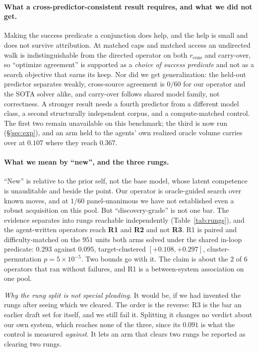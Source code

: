 \documentclass[11pt]{article}
\begin{document}
\paragraph{What a cross-predictor-consistent result requires, and what we did not get.} Making the success
predicate a conjunction does help, and the help is small and does not survive attribution. At matched caps and
matched access an undirected walk is indistinguishable from the directed operator on both $r_{\mathrm{cons}}$
and carry-over, so ``optimize agreement'' is supported as a \emph{choice of success predicate} and not as a
search objective that earns its keep. Nor did we get generalization: the held-out predictor separates weakly,
cross-source agreement is $0/60$ for our operator and the SOTA solver alike, and carry-over follows shared
model family, not correctness. A stronger result needs a fourth predictor from a different model class, a
second structurally independent corpus, and a compute-matched control. The first two remain unavailable on
this benchmark; the third is now run (\S\ref{sec:exp}), and an arm held to the agents' own realized oracle
volume carries over at $0.107$ where they reach $0.367$.

\paragraph{What we mean by ``new'', and the three rungs.} ``New'' is relative to the prior self, not the base
model, whose latent competence is unauditable and beside the point. Our operator is oracle-guided search over
known moves, and at $1/60$ panel-unanimous we have not established even a robust acquisition on this pool.
But ``discovery-grade'' is not one bar. The evidence separates into rungs reachable independently
(Table~\ref{tab:rungs}), and the agent-written operators reach \textbf{R1} and \textbf{R2} and not
\textbf{R3}. R1 is paired and difficulty-matched on the $951$ units both arms solved under the shared in-loop
predicate: $0.293$ against $0.095$, target-clustered $[{+}0.108,{+}0.297]$, cluster-permutation
$p{=}5\!\times\!10^{-5}$. Two bounds go with it. The claim is about the $2$ of $6$ operators that ran without
failures, and R1 is a between-system association on one pool.

\emph{Why the rung split is not special pleading.} It would be, if we had invented the rungs after seeing
which we cleared. The order is the reverse: R3 is the bar an earlier draft set for itself, and we still fail
it. Splitting it changes no verdict about our own system, which reaches none of the three, since its $0.091$
is what the control is measured \emph{against}. It lets an arm that clears two rungs be reported as clearing
two rungs.
\end{document}

